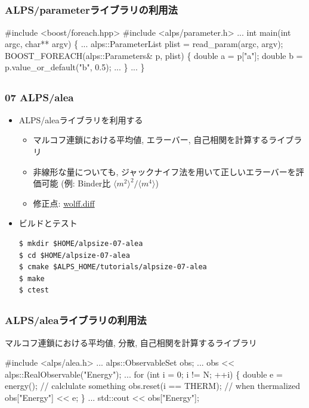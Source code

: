 \subsection*{\redm\whitem\greenb}
\begin{frame}[fragile,shrink=5]
\frametitle{ALPS/parameterライブラリの利用法}
\begin{semiverbatim}
#include <boost/foreach.hpp>
#include <alps/parameter.h>
...
int main(int argc, char** argv) \{
...
  alps::ParameterList plist = read_param(argc, argv);
  BOOST_FOREACH(alps::Parameters& p, plist) \{
    \alert<1>{double a = p["a"];}
    \alert<2>{double b = p.value_or_default("b", 0.5);}
...
  \}
...
\}
\end{semiverbatim}
\end{frame}

\subsection*{\redm\whitem\greenb}
\begin{frame}[fragile]
  \frametitle{07 ALPS/alea}
  \begin{itemize}
    \item ALPS/aleaライブラリを利用する
      \begin{itemize}
        \item マルコフ連鎖における平均値, エラーバー, 自己相関を計算するライブラリ
        \item 非線形な量についても, ジャックナイフ法を用いて正しいエラーバーを評価可能 (例: Binder比 $\langle m^2 \rangle^2 / \langle m^4 \rangle$)
        \item 修正点: \href{https://github.com/cmsi/alps-tutorial/blob/develop/alpsize/07-wolff.diff}{wolff.diff}
      \end{itemize}
    \item ビルドとテスト
\begin{lstlisting}
$ mkdir $HOME/alpsize-07-alea
$ cd $HOME/alpsize-07-alea
$ cmake $ALPS_HOME/tutorials/alpsize-07-alea
$ make
$ ctest
\end{lstlisting}
  \end{itemize}
\end{frame}

\subsection*{\redm\whitem\greenb}
\begin{frame}[fragile,shrink=10]
  \frametitle{ALPS/aleaライブラリの利用法}
  マルコフ連鎖における平均値, 分散, 自己相関を計算するライブラリ
\begin{semiverbatim}
#include <alps/alea.h>
...
alps::ObservableSet obs;
...
obs << alps::RealObservable("Energy");
...
for (int i = 0; i != N; ++i) \{
  double e = energy(); // calclulate something
  obs.reset(i == THERM); // when thermalized
  obs["Energy"] << e;
\}
...
std::cout << obs["Energy"];
\end{semiverbatim}
\end{frame}

